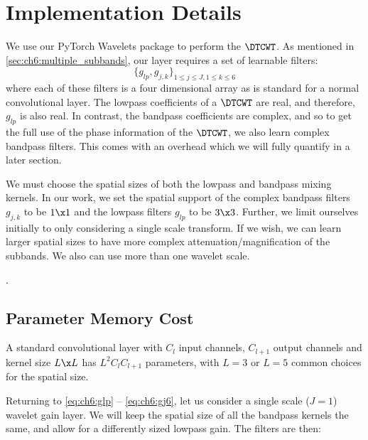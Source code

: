 \section{Implementation Details}

We use our PyTorch Wavelets package \cite{cotter_pytorch_2018} to perform the $\DTCWT$. As
mentioned in \autoref{sec:ch6:multiple_subbands}, our layer requires a set
of learnable filters:
\begin{equation}
  \{ g_{lp}, g_{j,k} \}_{1\leq j \leq J, 1\leq k\leq 6}
\end{equation}
where each of these filters is a four dimensional array as is standard for a
normal convolutional layer. The lowpass coefficients of a $\DTCWT$ are real, and
therefore, $g_{lp}$ is also real. In contrast, the bandpass coefficients are
complex, and so to get the full use of the phase information of the $\DTCWT$, we
also learn complex bandpass filters. This comes with an overhead which we will 
fully quantify in a later section.

We must choose the spatial sizes of both the lowpass and bandpass
mixing kernels. In our work, we set the spatial support of the complex bandpass
filters $g_{j,k}$ to be $1\x 1$ and the lowpass filters $g_{lp}$ to be $3\x 3$.
Further, we limit ourselves initially to only considering a single scale
transform.  
If we wish, we can learn larger spatial sizes to have more complex
attenuation/magnification of the subbands. We also can use more than
one wavelet scale. 

. 

\subsection{Parameter Memory Cost}\label{sec:ch6:memory}
A standard convolutional layer with $C_l$ input channels, $C_{l+1}$ output channels
and kernel size $L\x L$ has $L^2C_{l}C_{l+1}$ parameters, with $L=3$ or $L=5$
common choices for the spatial size.

Returning to \eqref{eq:ch6:glp} -- \eqref{eq:ch6:gj6}, let us consider a single
scale ($J=1$) wavelet gain layer. We will keep the spatial size of all the bandpass
kernels the same, and allow for a differently sized lowpass gain. The filters
are then:

